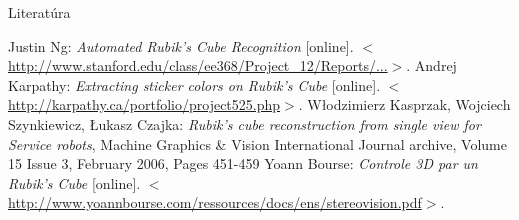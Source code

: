 \documentclass[red]{beamer}
\begin{document}
\newcommand{\bibnet}[3]{#1: \textit{#2} [online]. \scriptsize$<$\mbox{\url{#3}}$>$\normalsize.}
\newcommand{\bibnetEllipsis}[4]{#1: \textit{#2} [online]. \scriptsize$<$\href{#3}{#4}$>$\normalsize.}

\begin{frame}{Literatúra}

\begin{raggedright}
\begin{thebibliography}{9}
  \bibnetEllipsis{Justin Ng}{Automated Rubik's Cube Recognition}
  {http://www.stanford.edu/class/ee368/Project_12/Reports/Ng_Rubiks\%20Cube_Reconstruction_from_Images.pdf}
  {http://www.stanford.edu/class/ee368/Project\_12/Reports/...}
  \bibnet{Andrej Karpathy}{Extracting sticker colors on Rubik’s Cube}
  {http://karpathy.ca/portfolio/project525.php}
  W\l odzimierz Kasprzak, Wojciech Szynkiewicz, \L ukasz Czajka: \textit{Rubik's cube reconstruction from single view for Service robots}, Machine Graphics \& Vision International Journal archive, Volume 15 Issue 3, February 2006, Pages 451-459
  \bibnet{Yoann Bourse}{Controle 3D par un Rubik's Cube}{http://www.yoannbourse.com/ressources/docs/ens/stereovision.pdf}
\end{thebibliography}
\end{raggedright}
\end{frame}
\end{document}
